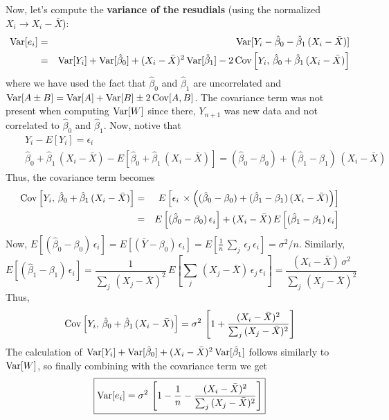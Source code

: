 \documentclass[aps,prl,preprint,superscriptaddress]{revtex4-1}
\begin{document}
Now, let's compute the {\bf variance of the resudials} (using the normalized $X_i \rightarrow X_i - {\bar X}$): 
%
\begin{eqnarray}
{\rm Var}[e_i] &=& {\rm Var}[Y_i - {\hat \beta}_0 - {\hat \beta}_1\, (X_i - {\bar X})] \nonumber\\
               &=& {\rm Var}[Y_i] + {\rm Var}[{\hat \beta}_0] + (X_i - {\bar X})^2\, {\rm Var}[{\hat \beta}_1]
                   -2\, {\rm Cov}\left[ Y_i, \, {\hat \beta}_0 + {\hat \beta}_1\, (X_i - {\bar X}) \right] \nonumber\\
\end{eqnarray}
% 
where we have used the fact that ${\hat \beta}_0$ and ${\hat \beta}_1$ are uncorrelated and 
${\rm Var}[A \pm B] = {\rm Var}[A] + {\rm Var}[B] \pm 2\, {\rm Cov}[A,B]$. The covariance term
was not present when computing ${\rm Var}[W]$ since there, $Y_{n+1}$ was new data and not 
correlated to ${\hat \beta}_0$ and ${\hat \beta}_1$. Now, notive that
%
\begin{eqnarray}
&& Y_i - E[Y_i] = \epsilon_i \nonumber\\
&& {\hat \beta}_0 + {\hat \beta}_1\, (X_i - {\bar X}) - E\left[ {\hat \beta}_0 + {\hat \beta}_1\, (X_i - {\bar X}) \right] = 
   ({\hat \beta}_0 - \beta_0) + ({\hat \beta}_1 - \beta_1)\, (X_i - {\bar X})
\end{eqnarray}
%
Thus, the covariance term becomes
%
\begin{eqnarray}
{\rm Cov}\left[ Y_i, \, {\hat \beta}_0 + {\hat \beta}_1\, (X_i - {\bar X}) \right] &=&
  E\left[ \epsilon_i\, \times \left( ({\hat \beta}_0 - \beta_0) + ({\hat \beta}_1 - \beta_1)\, (X_i - {\bar X}) \right) \right] \nonumber\\
%
&=& E\left[ ({\hat \beta}_0 - \beta_0)\, \epsilon_i \right] + (X_i - {\bar X})\, E\left[ ({\hat \beta}_1 - \beta_1)\, \epsilon_i \right]
\end{eqnarray}
%
Now, $E[({\hat \beta}_0 - \beta_0)\, \epsilon_i] = E[({\bar Y}-\beta_0)\, \epsilon_i] = 
 E[ \frac{1}{n}\, \sum_j\, \epsilon_j\, \epsilon_i] = \sigma^2/n$. Similarly, 
%
\begin{equation}
E\left[ ({\hat \beta}_1 - \beta_1)\, \epsilon_i \right] = \frac{1}{\sum_j\, (X_j - {\bar X})^2}\, 
  E \left[ \sum_j\, (X_j - {\bar X})\, \epsilon_j\, \epsilon_i \right] 
    = \frac{(X_i-{\bar X})\, \sigma^2}{\sum_j\, (X_j - {\bar X})^2}
\end{equation}
%
Thus, 
%
\begin{equation}
{\rm Cov}\left[ Y_i, \, {\hat \beta}_0 + {\hat \beta}_1\, (X_i - {\bar X}) \right] = 
\sigma^2\, \left[ 1 + \frac{(X_i-{\bar X})^2}{\sum_j\, (X_j - {\bar X})^2} \right]
\end{equation}
%
The calculation of ${\rm Var}[Y_i] + {\rm Var}[{\hat \beta}_0] + (X_i - {\bar X})^2\, {\rm Var}[{\hat \beta}_1]$ 
follows similarly to ${\rm Var}[W]$, so finally combining with the covariance term we get
%
\begin{equation}
\boxed{
{\rm Var}[e_i] = \sigma^2\, \left[  1 - \frac{1}{n} - \frac{(X_i-{\bar X})^2}{\sum_j\, (X_j - {\bar X})^2} \right]
}
\end{equation}
%      
\end{document}
